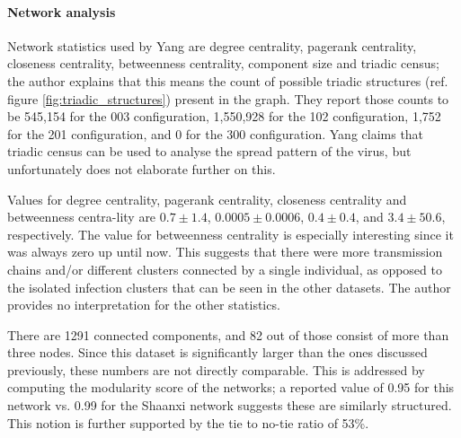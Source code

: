 \paragraph{Network analysis} Network statistics used by Yang are degree centrality, pagerank centrality, closeness centrality, betweenness centrality, component size and triadic census; the author explains that this means the count of possible triadic structures (ref. figure \ref{fig:triadic_structures}) present in the graph. They report those counts to be 545,154 for the 003 configuration, 1,550,928 for the 102 configuration, 1,752 for the 201 configuration, and 0 for the 300 configuration. Yang claims that triadic census can be used to analyse the spread pattern of the virus, but unfortunately does not elaborate further on this.

Values for degree centrality, pagerank centrality, closeness centrality and betweenness centra-lity are $0.7\pm1.4$, $0.0005\pm0.0006$, $0.4\pm0.4$, and $3.4\pm50.6$, respectively. The value for betweenness centrality is especially interesting since it was always zero up until now. This suggests that there were more transmission chains and/or different clusters connected by a single individual, as opposed to the isolated infection clusters that can be seen in the other datasets. The author provides no interpretation for the other statistics.

There are 1291 connected components, and 82 out of those consist of more than three nodes. Since this dataset is significantly larger than the ones discussed previously, these numbers are not directly comparable. This is addressed by computing the modularity score of the networks; a reported value of 0.95 for this network vs. 0.99 for the Shaanxi network suggests these are similarly structured. This notion is further supported by the tie to no-tie ratio of 53\%.


